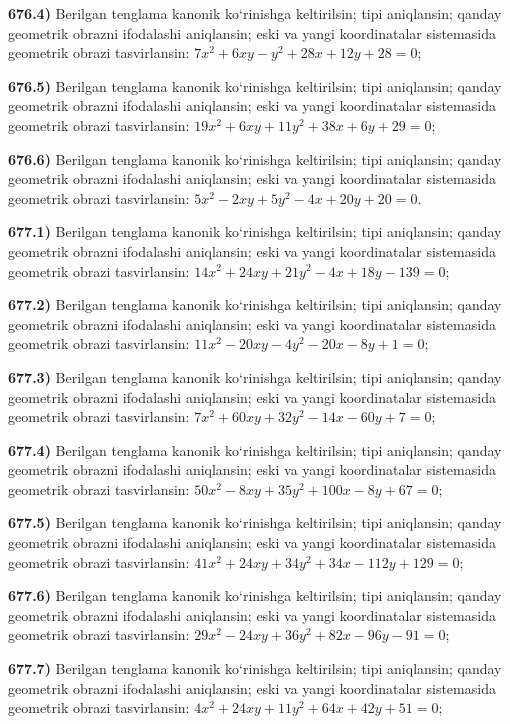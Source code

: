 \textbf{676.4)} Berilgan tenglama kanonik ko‘rinishga keltirilsin; tipi aniqlansin; qanday geometrik obrazni ifodalashi aniqlansin; eski va yangi koordinatalar sistemasida geometrik obrazi tasvirlansin: $7 x^2+6 x y-y^2+28 x+12 y+28=0$;

\textbf{676.5)} Berilgan tenglama kanonik ko‘rinishga keltirilsin; tipi aniqlansin; qanday geometrik obrazni ifodalashi aniqlansin; eski va yangi koordinatalar sistemasida geometrik obrazi tasvirlansin: $19 x^2+6 x y+11 y^2+38 x+6 y+29=0$;

\textbf{676.6)} Berilgan tenglama kanonik ko‘rinishga keltirilsin; tipi aniqlansin; qanday geometrik obrazni ifodalashi aniqlansin; eski va yangi koordinatalar sistemasida geometrik obrazi tasvirlansin: $5 x^2-2 x y+5 y^2-4 x+20 y+20=0$.

\textbf{677.1)} Berilgan tenglama kanonik ko‘rinishga keltirilsin; tipi aniqlansin; qanday geometrik obrazni ifodalashi aniqlansin; eski va yangi koordinatalar sistemasida geometrik obrazi tasvirlansin: $14 x^2+24 x y+21 y^2-4 x+18 y-139=0$;

\textbf{677.2)} Berilgan tenglama kanonik ko‘rinishga keltirilsin; tipi aniqlansin; qanday geometrik obrazni ifodalashi aniqlansin; eski va yangi koordinatalar sistemasida geometrik obrazi tasvirlansin: $11 x^2-20 x y-4 y^2-20 x-8 y+1=0$;

\textbf{677.3)} Berilgan tenglama kanonik ko‘rinishga keltirilsin; tipi aniqlansin; qanday geometrik obrazni ifodalashi aniqlansin; eski va yangi koordinatalar sistemasida geometrik obrazi tasvirlansin: $7 x^2+60 x y+32 y^2-14 x-60 y+7=0$;

\textbf{677.4)} Berilgan tenglama kanonik ko‘rinishga keltirilsin; tipi aniqlansin; qanday geometrik obrazni ifodalashi aniqlansin; eski va yangi koordinatalar sistemasida geometrik obrazi tasvirlansin: $50 x^2-8 x y+35 y^2+100 x-8 y+67=0$;

\textbf{677.5)} Berilgan tenglama kanonik ko‘rinishga keltirilsin; tipi aniqlansin; qanday geometrik obrazni ifodalashi aniqlansin; eski va yangi koordinatalar sistemasida geometrik obrazi tasvirlansin: $41 x^2+24 x y+34 y^2+34 x-112 y+129=0$;

\textbf{677.6)} Berilgan tenglama kanonik ko‘rinishga keltirilsin; tipi aniqlansin; qanday geometrik obrazni ifodalashi aniqlansin; eski va yangi koordinatalar sistemasida geometrik obrazi tasvirlansin: $29 x^2-24 x y+36 y^2+82 x-96 y-91=0$;

\textbf{677.7)} Berilgan tenglama kanonik ko‘rinishga keltirilsin; tipi aniqlansin; qanday geometrik obrazni ifodalashi aniqlansin; eski va yangi koordinatalar sistemasida geometrik obrazi tasvirlansin: $4 x^2+24 x y+11 y^2+64 x+42 y+51=0$;

